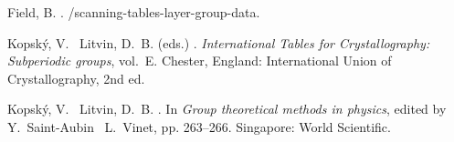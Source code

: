 \begin{thebibliography}{23}
	\baselineskip=9pt\parskip=0pt
	
	Field, B.  \harvardyearright{}.
	/scanning-tables-layer-group-data.
	\newline{}
	
	Kopsk\'{y}, V. \harvardand\ Litvin, D.~B. (eds.)  \harvardyearright{}.
	\newblock \emph{International {Tables} for {Crystallography}: {Subperiodic}
		groups}, vol.~E.
	\newblock Chester, England: International Union of Crystallography, 2nd ed.
	\newline{}
	
	Kopsk\'{y}, V. \harvardand\ Litvin, D.~B.  \harvardyearright{}.
	\newblock In \emph{Group theoretical methods in physics}, edited by
	Y.~Saint-Aubin \harvardand\ L.~Vinet, pp. 263--266. Singapore: World
	Scientific.
\end{thebibliography}
